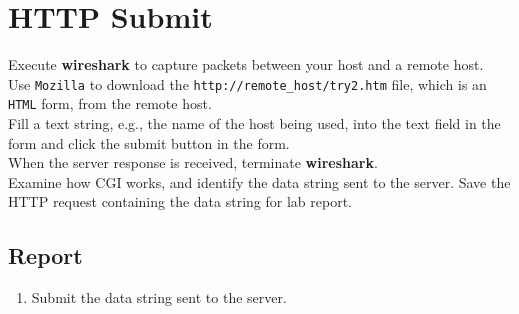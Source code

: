 \documentclass[10pt,a4paper]{article}
\numberwithin{equation}{section}
\numberwithin{figure}{section}
\numberwithin{table}{section}
\begin{document}
    \section{HTTP Submit}
    Execute \textbf{wireshark} to capture packets between your host and a remote host. \\
    Use \texttt{Mozilla} to download the \texttt{http://remote\_host/try2.htm} file, which is an \texttt{HTML} form, from the remote host. \\
    Fill a text string, e.g., the name of the host being used, into the text field in the form and click the submit button in the form. \\
    When the server response is received, terminate \textbf{wireshark}. \\
    Examine how CGI works, and identify the data string sent to the server.
    Save the HTTP request containing the data string for lab report.

    \subsection*{Report}
    \begin{enumerate}
        \item Submit the data string sent to the server.
    \end{enumerate}


\end{document}
